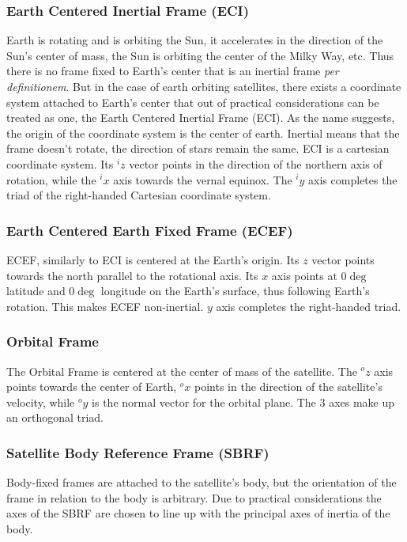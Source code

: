 \subsubsection{Earth Centered Inertial Frame (ECI)}
Earth is rotating and is orbiting the Sun, it accelerates in the direction of the Sun's center of mass, the Sun is orbiting the center of the Milky Way, etc. Thus there is no frame fixed to Earth's center that is an inertial frame \textit{per definitionem}. But in the case of earth orbiting satellites, there exists a coordinate system attached to Earth's center that out of practical considerations can be treated as one, the Earth Centered Inertial Frame (ECI).
As the name suggests, the origin of the coordinate system is the center of earth. Inertial means that the frame doesn't rotate, the direction of stars remain the same. 
ECI is a cartesian coordinate system. Its $^iz$ vector points in the direction of the northern axis of rotation, while the $^ix$ axis towards the vernal equinox. The $^iy$ axis completes the triad of the right-handed Cartesian coordinate system.




\subsubsection{Earth Centered Earth Fixed Frame (ECEF)}

ECEF, similarly to ECI is centered at the Earth's origin. Its $z$ vector points towards the north parallel to the rotational axis. Its $x$ axis points at $0\deg$ latitude and $0\deg$ longitude on the Earth's surface, thus following Earth's rotation. This makes ECEF non-inertial. $y$ axis completes the right-handed triad.

\subsubsection{Orbital Frame}

The Orbital Frame is centered at the center of mass of the satellite. The $^oz$ axis points towards the center of Earth, $^ox$ points in the direction of the satellite's velocity, while $^oy$ is the normal vector for the orbital plane. The 3 axes make up an orthogonal triad.


\subsubsection{Satellite Body Reference Frame (SBRF)}

Body-fixed frames are attached to the satellite's body, but the orientation of the frame in relation to the body is arbitrary. Due to practical considerations the axes of the SBRF are chosen to line up with the principal axes of inertia of the body.
